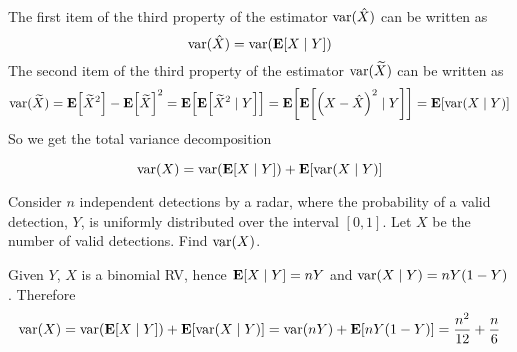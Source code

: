 The first item of the third property of the estimator $\mathrm{var}(\hat{X})$ can be written as 
\begin{equation}
    \mathrm{var}(\hat{X}) = \mathrm{var}\qty(\mathbf{E}[X \mid Y])
\end{equation}
The second item of the third property of the estimator $\mathrm{var}(\widetilde{X})$ can be written as
\begin{equation}
    \mathrm{var}(\widetilde{X}) = \mathbf{E}\qty[\widetilde{X}^2] - \mathbf{E}\qty[\widetilde{X}]^2 = \mathbf{E}\qty[\mathbf{E}\qty[\widetilde{X}^2 \mid Y]] = \mathbf{E}\qty[\mathbf{E}\qty[\qty(X - \hat{X})^2 \mid Y]] = \mathbf{E}[\mathrm{var}(X \mid Y)]
\end{equation}
So we get the total variance decomposition
\begin{theorem}
    \begin{equation}
        \mathrm{var}(X) = \mathrm{var}\qty(\mathbf{E}[X \mid Y]) + \mathbf{E}\qty[\mathrm{var}(X \mid Y)]
    \end{equation}
\end{theorem}
\begin{example}
    Consider $n$ independent detections by a radar, where the probability of a valid detection, $Y$, is uniformly distributed over the interval $[0, 1]$. Let $X$ be the number of valid detections. Find $\mathrm{var}(X)$.
\end{example}
\begin{solution}
    Given $Y$, $X$ is a binomial RV, hence $\mathbf{E}[X \mid Y] = nY$ and $\mathrm{var}(X \mid Y) = nY(1 - Y)$. Therefore
    \begin{equation}
        \mathrm{var}(X) = \mathrm{var}\qty(\mathbf{E}[X \mid Y]) + \mathbf{E}\qty[\mathrm{var}(X \mid Y)] = \mathrm{var}(nY) + \mathbf{E}[nY(1 - Y)] = \frac{n^2}{12} + \frac{n}{6}
    \end{equation}
\end{solution}
